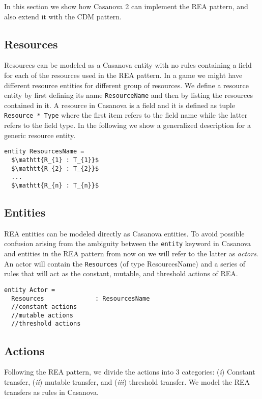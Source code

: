 In this section we show how Casanova 2 can implement the REA pattern, and also extend it with the CDM pattern.

\subsection{Resources}
Resources can be modeled as a Casanova entity with no rules containing a field for each of the resources used in the REA pattern. In a game we might have different resource entities for different group of resources. We define a resource entity by first defining its name \texttt{ResourceName} and then by listing the resources contained in it. A resource in Casanova is a field and it is defined as tuple \texttt{Resource * Type} where the first item refers to the field name while the latter refers to the field type. In the following we show a generalized description for a generic resource entity.

\begin{lstlisting}[mathescape]
entity ResourcesName =
  $\mathtt{R_{1} : T_{1}}$
  $\mathtt{R_{2} : T_{2}}$
  ...
  $\mathtt{R_{n} : T_{n}}$ 
\end{lstlisting}


\subsection{Entities}
REA entities can be modeled directly as Casanova entities. To avoid possible confusion arising from the ambiguity between the \texttt{entity} keyword in Casanova and entities in the REA pattern from now on we will refer to the latter as \textit{actors}. An actor will contain the \texttt{Resources} (of type ResourcesName) and a series of rules that will act as the constant, mutable, and threshold actions of REA.

\begin{lstlisting}
entity Actor = 
  Resources              : ResourcesName
  //constant actions
  //mutable actions
  //threshold actions
\end{lstlisting}

\subsection{Actions}
Following the REA pattern, we divide the actions into 3 categories: (\textit{i}) Constant transfer, (\textit{ii}) mutable transfer, and (\textit{iii}) threshold transfer. We model the REA transfers as rules in Casanova. 


